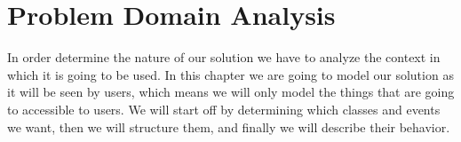 \chapter{Problem Domain Analysis}
In order determine the nature of our solution we have to analyze the context in which it is going to be used. In this chapter we are going to model our solution as it will be seen by users, which means we will only model the things that are going to accessible to users. We will start off by determining which classes and events we want, then we will structure them, and finally we will describe their behavior. 

